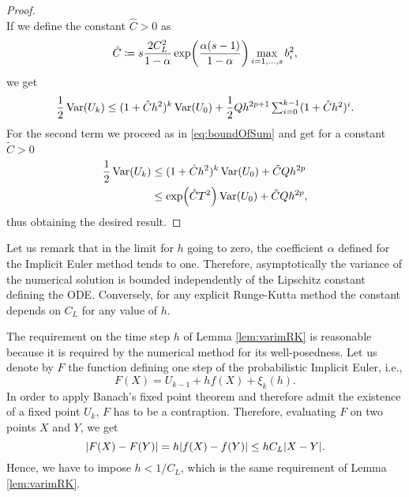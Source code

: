 \begin{proof}
\begin{equation}
\end{equation}
If we define the constant $\hat C > 0$ as 
\begin{equation}
\hat C \coloneqq s\frac{2C_L^2}{1 - \alpha}\exp(\frac{\alpha(s-1)}{1-\alpha})\max_{i=1,\ldots,s} b_i^2,
\end{equation}
we get
\begin{equation}
\frac{1}{2}\operatorname{Var}(U_k) \leq (1 + \hat C h^2)^k \operatorname{Var}(U_0) + \frac{1}{2} Qh^{2p+1}\textstyle\sum_{i=0}^{k-1} (1 + \hat C h^2)^i.
\end{equation}
For the second term we proceed as in \eqref{eq:boundOfSum} and get for a constant $\tilde C > 0$ \\
\begin{equation}
\begin{aligned}
\frac{1}{2}\operatorname{Var}(U_k) &\leq (1 + \hat C h^2)^k \operatorname{Var}(U_0) + \tilde C Q h^{2p} \\
&\leq \exp(\hat C T^2)\operatorname{Var}(U_0) + \tilde C Q h^{2p},
\end{aligned}
\end{equation}
thus obtaining the desired result.
\end{proof}
\begin{remark} Let us remark that in the limit for $h$ going to zero, the coefficient $\alpha$ defined for the Implicit Euler method tends to one. Therefore, asymptotically the variance of the numerical solution is bounded independently of the Lipschitz constant defining the ODE. Conversely, for any explicit Runge-Kutta method the constant depends on $C_L$ for any value of $h$.
\end{remark}
\begin{remark} The requirement on the time step $h$ of Lemma \ref{lem:varimRK} is reasonable because it is required by the numerical method for its well-posedness. Let us denote by $F$ the function defining one step of the probabilistic Implicit Euler, i.e., 
	\begin{equation}
	F(X) = U_{k-1} + hf(X) + \xi_k(h).
	\end{equation}
	In order to apply Banach's fixed point theorem and therefore admit the existence of a fixed point $U_{k}$, $F$ has to be a contraption. Therefore, evaluating $F$ on two points $X$ and $Y$, we get
	\begin{equation}
	\abs{F(X) - F(Y)} = h\abs{f(X) - f(Y)} \leq hC_L \abs{X - Y}.
	\end{equation}
	Hence, we have to impose $h < 1 / C_L$, which is the same requirement of Lemma \ref{lem:varimRK}. 
\end{remark}

